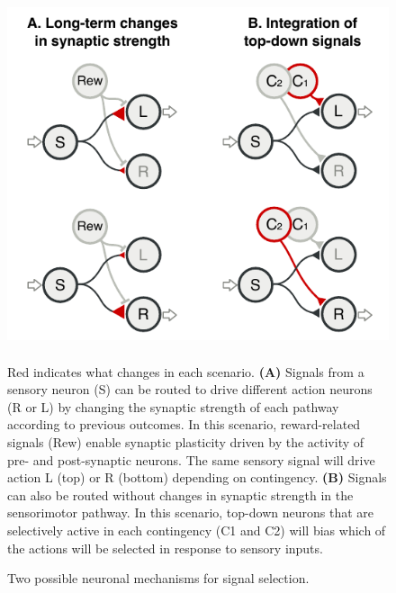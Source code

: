 \begin{figure}[hp]
  \begin{center}
    \includegraphics[height=4in]{figures/chapter5/figure_mechanisms}%
  \end{center}
\caption{Two possible neuronal mechanisms for signal selection.}{Red indicates what changes in each scenario. \textbf{(A)} Signals from a sensory neuron (S) can be routed to drive different action neurons (R or L) by changing the synaptic strength of each pathway according to previous outcomes. In this scenario, reward-related signals (Rew) enable synaptic plasticity driven by the activity of pre- and post-synaptic neurons. The same sensory signal will drive action L (top) or R (bottom) depending on contingency. \textbf{(B)} Signals can also be routed without changes in synaptic strength in the sensorimotor pathway. In this scenario, top-down neurons that are selectively active in each contingency (C1 and C2) will bias which of the actions will be selected in response to sensory inputs. 
}
\end{figure}


